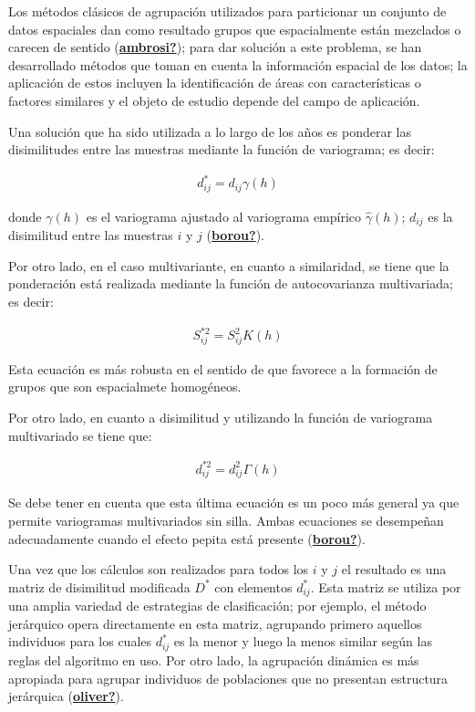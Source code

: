 \documentclass[
]{book}
\begin{document}
Los métodos clásicos de agrupación utilizados para particionar un conjunto de datos espaciales dan como resultado grupos que espacialmente están mezclados o carecen de sentido (\protect\hyperlink{ref-ambrosi}{\textbf{ambrosi?}}); para dar solución a este problema, se han desarrollado métodos que toman en cuenta la información espacial de los datos; la aplicación de estos incluyen la identificación de áreas con características o factores similares y el objeto de estudio depende del campo de aplicación.

Una solución que ha sido utilizada a lo largo de los años es ponderar las disimilitudes entre las muestras mediante la función de variograma; es decir:

\begin{align*}
    d_{ij}^*=d_{ij}\gamma(h)
\end{align*}

donde \(\gamma(h)\) es el variograma ajustado al variograma empírico \(\hat{\gamma}(h)\); \(d_{ij}\) es la disimilitud entre las muestras \(i\) y \(j\) (\protect\hyperlink{ref-borou}{\textbf{borou?}}).

Por otro lado, en el caso multivariante, en cuanto a similaridad, se tiene que la ponderación está realizada mediante la función de autocovarianza multivariada; es decir:

\begin{align*}
    S^{*2}_{ij}=S_{ij}^2K(h)
\end{align*}

Esta ecuación es más robusta en el sentido de que favorece a la formación de grupos que son espacialmete homogéneos.

Por otro lado, en cuanto a disimilitud y utilizando la función de variograma multivariado se tiene que:

\begin{align*}
    d_{ij}^{*2}=d_{ij}^2\Gamma(h)
\end{align*}

Se debe tener en cuenta que esta última ecuación es un poco más general ya que permite variogramas multivariados sin silla. Ambas ecuaciones se desempeñan adecuadamente cuando el efecto pepita está presente (\protect\hyperlink{ref-borou}{\textbf{borou?}}).

Una vez que los cálculos son realizados para todos los \(i\) y \(j\) el resultado es una matriz de disimilitud modificada \(D^*\) con elementos \(d_{ij}^*\). Esta matriz se utiliza por una amplia variedad de estrategias de clasificación; por ejemplo, el método jerárquico opera directamente en esta matriz, agrupando primero aquellos individuos para los cuales \(d_{ij}^*\) es la menor y luego la menos similar según las reglas del algoritmo en uso. Por otro lado, la agrupación dinámica es más apropiada para agrupar individuos de poblaciones que no presentan estructura jerárquica (\protect\hyperlink{ref-oliver}{\textbf{oliver?}}).
\end{document}
